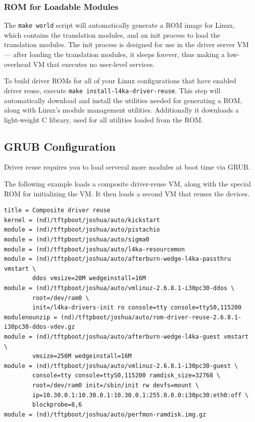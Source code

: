 \documentclass[10pt,a4paper]{article}
\newcommand{\cmd}[1]{\texttt{#1}}
\begin{document}
\subsubsection{ROM for Loadable Modules}

The \cmd{make world} script will automatically generate a ROM image
for Linux, which contains the translation modules, and an init process
to load the translation modules.  The init process is designed for use
in the driver server VM --- after loading the translation modules, it
sleeps forever, thus making a low-overhead VM that executes no
user-level services.

To build driver ROMs for all of your Linux configurations that have
enabled driver reuse, execute \cmd{make install-l4ka-driver-reuse}.
This step will automatically download and install the utilities needed
for generating a ROM, along with Linux's module management utilities.
Additionally it downloads a light-weight C library, used for all
utilities loaded from the ROM.

\subsection{GRUB Configuration}

Driver reuse requires you to load serveral more modules at boot time
via GRUB.  

The following example loads a composite driver-reuse VM, along
with the special ROM for initializing the VM.  It then loads a second
VM that reuses the devices.
\begin{footnotesize}
\begin{verbatim}
title = Composite driver reuse
kernel = (nd)/tftpboot/joshua/auto/kickstart
module = (nd)/tftpboot/joshua/auto/pistachio
module = (nd)/tftpboot/joshua/auto/sigma0
module = (nd)/tftpboot/joshua/auto/l4ka-resourcemon
module = (nd)/tftpboot/joshua/auto/afterburn-wedge-l4ka-passthru vmstart \
        ddos vmsize=20M wedgeinstall=16M
module = (nd)/tftpboot/joshua/auto/vmlinuz-2.6.8.1-i30pc30-ddos \
        root=/dev/ram0 \
        init=/l4ka-drivers-init ro console=tty console=ttyS0,115200
modulenounzip = (nd)/tftpboot/joshua/auto/rom-driver-reuse-2.6.8.1-i30pc30-ddos-vdev.gz
module = (nd)/tftpboot/joshua/auto/afterburn-wedge-l4ka-guest vmstart \
        vmsize=256M wedgeinstall=16M
module = (nd)/tftpboot/joshua/auto/vmlinuz-2.6.8.1-i30pc30-guest \
        console=tty console=ttyS0,115200 ramdisk_size=32768 \
        root=/dev/ram0 init=/sbin/init rw devfs=mount \
        ip=10.30.0.1:10.30.0.1:10.30.0.1:255.0.0.0:i30pc30:eth0:off \
        blockprobe=8,6
module = (nd)/tftpboot/joshua/auto/perfmon-ramdisk.img.gz
\end{verbatim}
\end{footnotesize}
\end{document}
